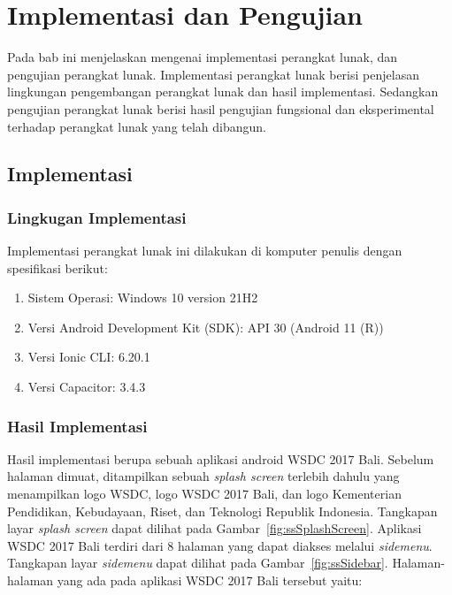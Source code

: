 \chapter{Implementasi dan Pengujian}
\label{chap:implementasipengujian}

Pada bab ini menjelaskan mengenai implementasi perangkat lunak, dan pengujian perangkat lunak. Implementasi perangkat lunak berisi penjelasan lingkungan pengembangan perangkat lunak dan hasil implementasi. Sedangkan pengujian perangkat lunak berisi hasil pengujian fungsional dan eksperimental terhadap perangkat lunak yang telah dibangun.

\section{Implementasi} 
\label{sec:implementasi}

\subsection{Lingkugan Implementasi}
\label{subsec:lingkunganimplementasi}

Implementasi perangkat lunak ini dilakukan di komputer penulis dengan spesifikasi berikut:
\begin{enumerate}
	\item Sistem Operasi: Windows 10 version 21H2
	\item Versi Android Development Kit (SDK): API 30 (Android 11 (R))
	\item Versi Ionic CLI: 6.20.1
	\item Versi Capacitor: 3.4.3
\end{enumerate}

\subsection{Hasil Implementasi}
\label{subsec:hasilimplementasi}

Hasil implementasi berupa sebuah aplikasi android WSDC 2017 Bali. Sebelum halaman dimuat, ditampilkan sebuah \textit{splash screen} terlebih dahulu yang menampilkan logo WSDC, logo WSDC 2017 Bali, dan logo Kementerian Pendidikan, Kebudayaan, Riset, dan Teknologi Republik Indonesia. Tangkapan layar \textit{splash screen} dapat dilihat pada Gambar~\ref{fig:ssSplashScreen}. Aplikasi WSDC 2017 Bali terdiri dari 8 halaman yang dapat diakses melalui \textit{sidemenu}. Tangkapan layar \textit{sidemenu} dapat dilihat pada Gambar~\ref{fig:ssSidebar}. Halaman-halaman yang ada pada aplikasi WSDC 2017 Bali tersebut yaitu:

